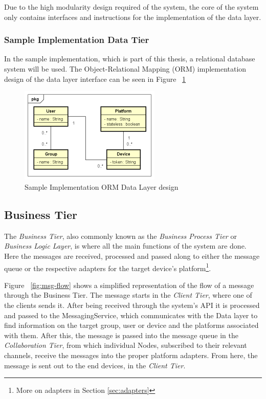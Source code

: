 Due to the high modularity design required of the system, the core of the system only contains interfaces and instructions for the implementation of the data layer.

\subsubsection{Sample Implementation Data Tier}
In the sample implementation, which is part of this thesis, a relational database system will be used. The Object-Relational Mapping (ORM) implementation design of the data layer interface can be seen in Figure ~\ref{fig:orm}

\begin{figure}[H]
	\centering
	\includegraphics[width=0.6\textwidth]{figures/03_design/orm}
    \caption{Sample Implementation ORM Data Layer design}
    \label{fig:orm}
\end{figure}

\subsection{Business Tier}
The \textit{Business Tier}, also commonly known as the \textit{Business Process Tier} or \textit{Business Logic Layer}, is where all the main functions of the system are done. Here the messages are received, processed and passed along to either the message queue or the respective adapters for the target device's platform\footnote{More on adapters in Section \ref{sec:adapters}}.

Figure ~\ref{fig:msg-flow} shows a simplified representation of the flow of a message through the Business Tier. The message starts in the \textit{Client Tier}, where one of the clients sends it. After being received through the system's API it is processed and passed to the MessagingService, which communicates with the Data layer to find information on the target group, user or device and the platforms associated with them. After this, the message is passed into the message queue in the \textit{Collaboration Tier}, from which individual Nodes, subscribed to their relevant channels, receive the messages into the proper platform adapters. From here, the message is sent out to the end devices, in the \textit{Client Tier}.

